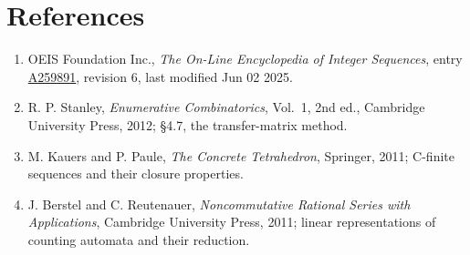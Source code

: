 \documentclass[11pt]{article}
\theoremstyle{definition}
\begin{document}
\section{References}

\begin{enumerate}

\item OEIS Foundation Inc., \emph{The On-Line Encyclopedia of Integer Sequences}, entry \href{https://oeis.org/A259891}{A259891}, revision 6, last modified Jun 02 2025.

\item R. P. Stanley, \emph{Enumerative Combinatorics}, Vol.~1, 2nd ed., Cambridge University Press, 2012; \S4.7, the transfer-matrix method.

\item M. Kauers and P. Paule, \emph{The Concrete Tetrahedron}, Springer, 2011; C-finite sequences and their closure properties.

\item J. Berstel and C. Reutenauer, \emph{Noncommutative Rational Series with Applications}, Cambridge University Press, 2011; linear representations of counting automata and their reduction.

\end{enumerate}
\end{document}
